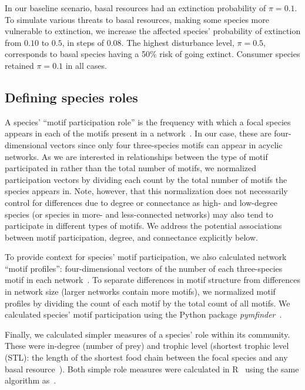 \documentclass[12pt]{article}
\begin{document}
\begin{spacing}{2.0}
        In our baseline scenario, basal resources had an extinction probability of $\pi = 0.1$. 
		To simulate various threats to basal resources, making some species more vulnerable to extinction, we increase the affected species' probability of extinction from $0.10$ to $0.5$, in steps of $0.08$. 
		The highest disturbance level, $\pi = 0.5$, corresponds to basal species having a 50\% risk of going extinct. 
		Consumer species retained $\pi=0.1$ in all cases.
		
		
	\subsection*{Defining species roles}

        A species' ``motif participation role'' is the frequency with which a focal species appears in each of the motifs present in a network~\citep{Stouffer2012}.
        In our case, these are four-dimensional vectors since only four three-species motifs can appear in acyclic networks.
        As we are interested in relationships between the type of motif participated in rather than the total number of motifs, we normalized participation vectors by dividing each count by the total number of motifs the species appears in.
        Note, however, that this normalization does not necessarily control for differences due to degree or connectance as high- and low-degree species (or species in more- and less-connected networks) may also tend to participate in different types of motifs.
        We address the potential associations between motif participation, degree, and connectance explicitly below. 
        
        
        To provide context for species' motif participation, we also calculated network ``motif profiles'': four-dimensional vectors of the number of each three-species motif in each network~\citep{Stouffer2012}.
        To separate differences in motif structure from differences in network size (larger networks contain more motifs), we normalized motif profiles by dividing the count of each motif by the total count of all motifs. 
		We calculated species' motif participation using the Python package \emph{pymfinder}~\citep{pymfinder}.


        Finally, we calculated simpler measures of a species' role within its community.
        These were in-degree (number of prey) and trophic level (shortest trophic level (STL): the length of the shortest food chain between the focal species and any basal resource~\citep{Williams2004}).
        Both simple role measures were calculated in R~\citep{R} using the same algorithm as~\citet{Eklof2013}.
        



\end{spacing}
\end{document}
